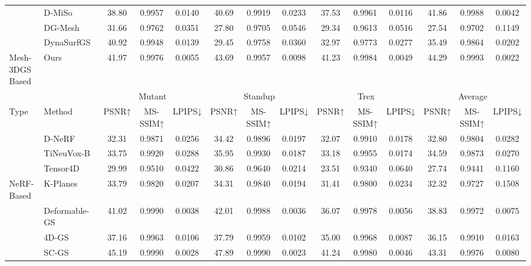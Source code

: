 \begin{table}[t]
{\begin{tabular}{@{}llcccccccccccc@{}}
 & D-MiSo~\cite{waczynska_d-miso_2024} & 38.80 & 0.9957 & 0.0140 & 40.69 & 0.9919 & 0.0233 & 37.53 & 0.9961 & 0.0116 & \cellcolor[HTML]{FAC791}41.86 & \cellcolor[HTML]{FAC791}0.9988 & \cellcolor[HTML]{FAC791}0.0042 \\
 & DG-Mesh~\cite{liu_dynamic_2024} & 31.66 & 0.9762 & 0.0351 & 27.80 & 0.9705 & 0.0546 & 29.34 & 0.9613 & 0.0516 & 27.54 & 0.9702 & 0.1149 \\
 & DynaSurfGS~\cite{cai_dynasurfgs_2024} & 40.92 & 0.9948 & 0.0139 & 29.45 & 0.9758 & 0.0360 & 32.97 & 0.9773 & 0.0277 & 35.49 & 0.9864 & 0.0202 \\
\multirow{-4}{*}{Mesh-3DGS Based} & Ours & \cellcolor[HTML]{FAC791}41.97 & \cellcolor[HTML]{FFFF8F}0.9976 & \cellcolor[HTML]{FAC791}0.0055 & \cellcolor[HTML]{F59194}43.69 & \cellcolor[HTML]{FAC791}0.9957 & \cellcolor[HTML]{F59194}0.0098 & \cellcolor[HTML]{F59194}41.23 & \cellcolor[HTML]{F59194}0.9984 & \cellcolor[HTML]{F59194}0.0049 & \cellcolor[HTML]{F59194}44.29 & \cellcolor[HTML]{F59194}0.9993 & \cellcolor[HTML]{F59194}0.0022 \\ \midrule
 &  & \multicolumn{3}{c}{Mutant} & \multicolumn{3}{c}{Standup} & \multicolumn{3}{c}{Trex} & \multicolumn{3}{c}{Average} \\
\multirow{-2}{*}{Type} & \multirow{-2}{*}{Method} & PSNR↑ & MS-SSIM↑ & LPIPS↓ & PSNR↑ & MS-SSIM↑ & LPIPS↓ & PSNR↑ & MS-SSIM↑ & LPIPS↓ & PSNR↑ & MS-SSIM↑ & LPIPS↓ \\ \midrule
 & D-NeRF & 32.31 & 0.9871 & 0.0256 & 34.42 & 0.9896 & 0.0197 & 32.07 & 0.9910 & 0.0178 & 32.80 & 0.9804 & 0.0282 \\
 & TiNeuVox-B & 33.75 & 0.9920 & 0.0288 & 35.95 & 0.9930 & 0.0187 & 33.18 & 0.9955 & 0.0174 & 34.59 & 0.9873 & 0.0270 \\
 & Tensor4D & 29.99 & 0.9510 & 0.0422 & 30.86 & 0.9640 & 0.0214 & 23.51 & 0.9340 & 0.0640 & 27.74 & 0.9441 & 0.1160 \\
\multirow{-4}{*}{NeRF-Based} & K-Planes & 33.79 & 0.9820 & 0.0207 & 34.31 & 0.9840 & 0.0194 & 31.41 & 0.9800 & 0.0234 & 32.32 & 0.9727 & 0.1508 \\ \cmidrule(lr){2-2}
 & Deformable-GS & 41.02 & 0.9990 & 0.0038 & 42.01 & 0.9988 & 0.0036 & 36.07 & 0.9978 & 0.0056 & 38.83 & 0.9972 & \cellcolor[HTML]{FFFF8F}0.0075 \\
 & 4D-GS & 37.16 & 0.9963 & 0.0106 & 37.79 & 0.9959 & 0.0102 & 35.00 & 0.9968 & 0.0087 & 36.15 & 0.9910 & 0.0163 \\
 & SC-GS & \cellcolor[HTML]{FFFF8F}45.19 & 0.9990 & 0.0028 & \cellcolor[HTML]{FAC791}47.89 & 0.9990 & 0.0023 & \cellcolor[HTML]{FAC791}41.24 & 0.9980 & 0.0046 & \cellcolor[HTML]{FAC791}43.31 & \cellcolor[HTML]{FFFF8F}0.9976 & 0.0080 \\

\end{tabular}}
\end{table}
